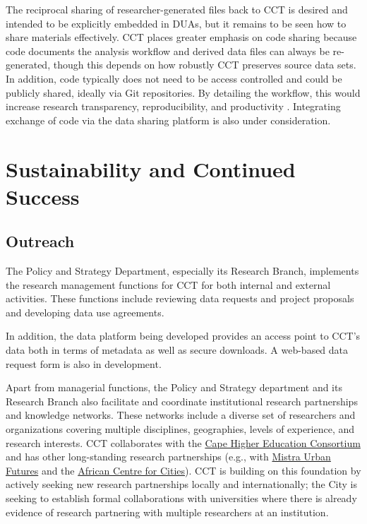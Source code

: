 The reciprocal sharing of researcher-generated files back to CCT is desired and intended to be explicitly embedded in DUAs, but it remains to be seen how to share materials effectively. CCT places greater emphasis on code sharing because code documents the analysis workflow and derived data files can always be re-generated, though this depends on how robustly CCT preserves source data sets. In addition, code typically does not need to be access controlled and could be publicly shared, ideally via Git repositories. By detailing the workflow, this would increase research transparency, reproducibility, and productivity \citep{playford2016}. Integrating exchange of code via the data sharing platform is also under consideration.

\hypertarget{sustainability-and-continued-success-5}{%
\section{Sustainability and Continued Success}\label{sustainability-and-continued-success-5}}

\hypertarget{outreach-4}{%
\subsection{Outreach}\label{outreach-4}}

The Policy and Strategy Department, especially its Research Branch, implements the research management functions for CCT for both internal and external activities. These functions include reviewing data requests and project proposals and developing data use agreements.

In addition, the data platform being developed provides an access point to CCT's data both in terms of metadata as well as secure downloads. A web-based data request form is also in development.

Apart from managerial functions, the Policy and Strategy department and its Research Branch also facilitate and coordinate institutional research partnerships and knowledge networks. These networks include a diverse set of researchers and organizations covering multiple disciplines, geographies, levels of experience, and research interests. CCT collaborates with the \href{http://www.chec.ac.za}{Cape Higher Education Consortium} and has other long-standing research partnerships (e.g., with \href{https://www.mistraurbanfutures.org}{Mistra Urban Futures} and the \href{https://www.africancentreforcities.net}{African Centre for Cities}). CCT is building on this foundation by actively seeking new research partnerships locally and internationally; the City is seeking to establish formal collaborations with universities where there is already evidence of research partnering with multiple researchers at an institution.

